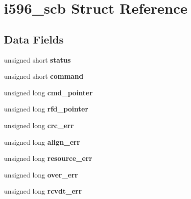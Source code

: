 \hypertarget{structi596__scb}{}\section{i596\+\_\+scb Struct Reference}
\label{structi596__scb}
\subsection*{Data Fields}
\begin{DoxyCompactItemize}
\item 
\mbox{\label{structi596__scb_a470d308089c69595a88c09541627a2cd}} 
unsigned short {\bfseries status}
\item 
\mbox{\label{structi596__scb_a4ddaad7b2107d892654184ace3ed7560}} 
unsigned short {\bfseries command}
\item 
\mbox{\label{structi596__scb_a1abc94fd7821d02c1eb514febbf02a31}} 
unsigned long {\bfseries cmd\+\_\+pointer}
\item 
\mbox{\label{structi596__scb_a2039fe59b2a0554c39eea45e5152782f}} 
unsigned long {\bfseries rfd\+\_\+pointer}
\item 
\mbox{\label{structi596__scb_a23052b809f5274a4b7a42008cbf1b9a5}} 
unsigned long {\bfseries crc\+\_\+err}
\item 
\mbox{\label{structi596__scb_a1e89da413aadf3faafaf7cf33b869a74}} 
unsigned long {\bfseries align\+\_\+err}
\item 
\mbox{\label{structi596__scb_a1f9b6f82157aabd46c2cc21e24443576}} 
unsigned long {\bfseries resource\+\_\+err}
\item 
\mbox{\label{structi596__scb_a6f5435eb9405a66f5bcde6abf0ee2529}} 
unsigned long {\bfseries over\+\_\+err}
\item 
\mbox{\label{structi596__scb_a6b134f665605826c11a9c02e0def756c}} 
unsigned long {\bfseries rcvdt\+\_\+err}
\item 
\mbox{\label{structi596__scb_a4f644bdc14c2f542732aa68814fcfd45}} 

\end{DoxyCompactItemize}
